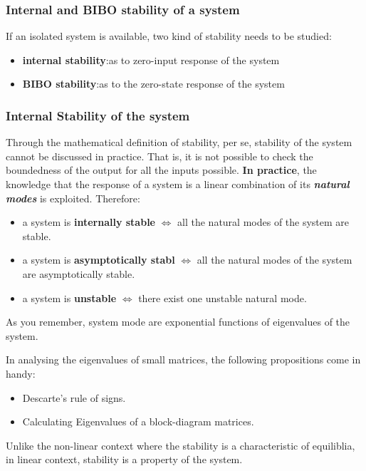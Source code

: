 \subsubsection{Internal and BIBO stability of a system}
If an isolated system is available, two kind of stability needs to be studied:
\begin{itemize}
\item\textbf{internal stability}:as to zero-input response of the system
\item\textbf{BIBO stability}:as to the zero-state response of the system
\end{itemize}

\subsubsection{Internal Stability of the system}
Through the mathematical definition of stability, per se, stability of the system cannot be discussed in practice. That is, it is not possible to check the boundedness of the output for all the inputs possible. \textbf{In practice}, the knowledge that the response of a system is a linear combination of its \textit{\textbf{natural modes}} is exploited. Therefore:
\begin{itemize}
    \item a system is \textbf{internally stable} \(\iff \) all the natural modes of the system are stable.
    \item a system is \textbf{asymptotically stabl} \(\iff \) all the natural modes of the system are asymptotically stable.
    \item a system is \textbf{unstable} \(\iff \) there exist one unstable natural mode.
\end{itemize}
As you remember, system mode are exponential functions of eigenvalues of the system.

In analysing the eigenvalues of small matrices, the following propositions come in handy:
\begin{itemize}
    \item Descarte's rule of signs.
    \item Calculating Eigenvalues of a block-diagram matrices.
\end{itemize}

\begin{factbox}
Unlike the non-linear context where the stability is a characteristic of equiliblia, in linear context, stability is a property of the system.
\end{factbox}


